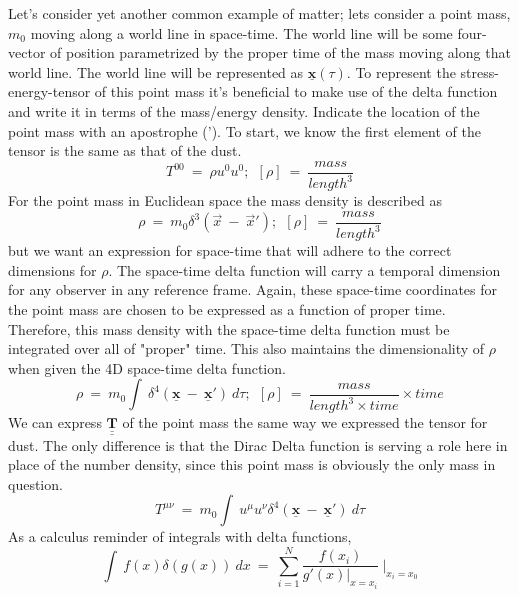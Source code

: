\hskip 25pt  Let's consider yet another common example of matter; lets consider a point mass, $m_0$ moving along a
world line in space-time.  The world line will be some four-vector of position parametrized by the proper time of the
mass moving along that world line.  The world line will be represented as $\underline{\mathbf{x}}(\tau)$.  To represent
the stress-energy-tensor of this point mass it's beneficial to make use of the delta function and write it in terms of
the mass/energy density.  Indicate the location of the point mass with an apostrophe (').  To start, we know the first
element of the tensor is the same as that of the dust.
\begin{equation}
  T^{00}\ =\ \rho u^0u^0;\ \ [\rho]\ =\ \frac{\mathit{mass}}{\mathit{length}^3}
\end{equation}
For the point mass in Euclidean space the mass density is described as
\begin{equation}
  \rho\ =\ m_0\delta^3\left (\vec{x}\ -\ \vec{x}'\right );\ \ [\rho]\ =\ \frac{\mathit{mass}}{\mathit{length}^3}
\end{equation}
but we want an expression for space-time that will adhere to the correct dimensions for $\rho$.  The space-time
delta function will carry a temporal dimension for any observer in any reference frame.  Again, these space-time
coordinates for the point mass are chosen to be expressed as a function of proper time.  Therefore, this mass
density with the space-time delta function must be integrated over all of "proper" time.  This also maintains the
dimensionality of $\rho$ when given the 4D space-time delta function.
\begin{equation}
  \rho\ =\ m_0\int\ \delta^4\left (\underline{\mathbf{x}}\ -\ \underline{\mathbf{x}}'\right )\ d\tau;\ \ 
  [\rho]\ =\ \frac{\mathit{mass}}{\mathit{length}^3\times\mathit{time}}\times\mathit{time}
\end{equation}
We can express $\underline{\underline{\mathbf{T}}}$ of the point mass the same way we expressed the tensor for dust.  The
only difference is that the Dirac Delta function is serving a role here in place of the number density, since this point
mass is obviously the only mass in question.
\begin{equation}
  T^{\mu\nu}\ =\ m_0\int\ u^{\mu}u^{\nu}\delta^4\left (\underline{\mathbf{x}}\ -\ \underline{\mathbf{x}}'\right )\ d\tau
\end{equation}
As a calculus reminder of integrals with delta functions,
\begin{equation}
  \int\ f(x)\delta\left (g(x)\right )\ dx\ =\ \sum_{i=1}^N\frac{f(x_i)}{g'(x)|_{x=x_i}}\ |_{x_i=x_0}
\end{equation}
